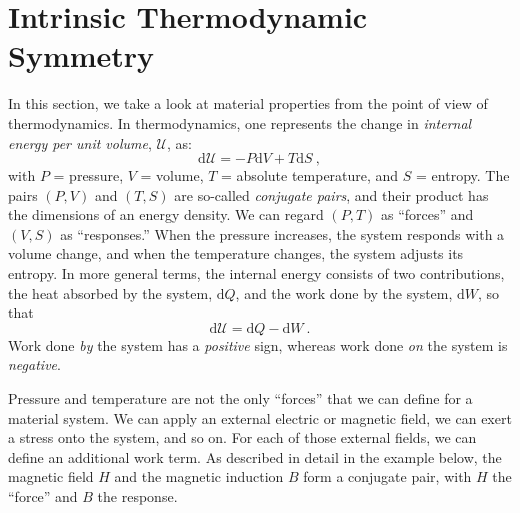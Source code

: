 \section{Intrinsic Thermodynamic Symmetry}\label{\chabbr:sec:thermosym}
In this section, we take a look at material properties from the point of view of thermodynamics.  In thermodynamics, one represents the change in \textit{internal energy per unit volume}, $\mathcal{U}$, as:
\begin{equation}
	\mathrm{d}\mathcal{U} = -P\mathrm{d}V+T\mathrm{d}S\ ,
\end{equation}
with $P$ = pressure, $V$ = volume, $T$ = absolute temperature, and $S$ = entropy.  The pairs $(P,V)$ and  $(T,S)$ are so-called \textit{conjugate pairs}, and their product has the dimensions of an energy density. We can regard $(P,T)$ as ``forces'' and $(V,S)$ as ``responses.''  When the pressure increases, the system responds with a volume change, and when the temperature changes, the system adjusts its entropy.  In more general terms, the internal energy consists of two contributions, the heat absorbed by the system, $\mathrm{d}Q$,  and the work done by the system, $\mathrm{d}W$, so that
\begin{equation}
	\mathrm{d}\mathcal{U} = \mathrm{d}Q-\mathrm{d}W\ .
\end{equation}
Work done \textit{by} the system has a \textit{positive} sign, whereas work done \textit{on} the system is \textit{negative}.

Pressure and temperature are not the only ``forces'' that we can define for a material system.  We can apply an external electric or magnetic field, we can exert a stress onto the system, and so on.  For each of those external fields, we can define an additional work term.  As described in detail in the example below, the magnetic field $H$ and the magnetic induction $B$ form a conjugate pair, with $H$ the ``force'' and $B$ the response.

